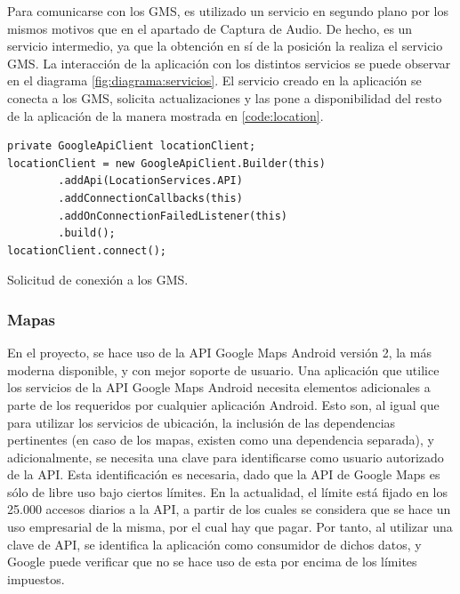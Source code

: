 Para comunicarse con los \ac{GMS}, es utilizado un servicio en segundo plano por los mismos motivos que en el apartado de Captura de Audio. De hecho, es un servicio intermedio, ya que la obtención en sí de la posición la realiza el servicio \ac{GMS}. La interacción de la aplicación con los distintos servicios se puede observar en el diagrama \ref{fig:diagrama:servicios}. El servicio creado en la aplicación se conecta a los \ac{GMS}, solicita actualizaciones y las pone a disponibilidad del resto de la aplicación de la manera mostrada en \ref{code:location}.

\begin{listing}[h] 
\begin{verbatim}
private GoogleApiClient locationClient;
locationClient = new GoogleApiClient.Builder(this)
        .addApi(LocationServices.API)
        .addConnectionCallbacks(this)
        .addOnConnectionFailedListener(this)
        .build();
locationClient.connect();
\end{verbatim}
\caption{Solicitud de conexión a los GMS.}
\label{code:location}
\end{listing}

\subsubsection{Mapas}
    En el proyecto, se hace uso de la API Google Maps Android versión 2, la más moderna disponible, y con mejor soporte de usuario. Una aplicación que utilice los servicios de la API Google Maps Android necesita elementos adicionales a parte de los requeridos por cualquier aplicación Android. Esto son, al igual que para utilizar los servicios de ubicación, la inclusión de las dependencias pertinentes (en caso de los mapas, existen como una dependencia separada), y adicionalmente, se necesita una clave para identificarse como usuario autorizado de la \ac{API}. Esta identificación es necesaria, dado que la API de Google Maps es sólo de libre uso bajo ciertos límites. En la actualidad, el límite está fijado en los 25.000 accesos diarios a la API, a partir de los cuales se considera que se hace un uso empresarial de la misma, por el cual hay que pagar. Por tanto, al utilizar una clave de API, se identifica la aplicación como consumidor de dichos datos, y Google puede verificar que no se hace uso de esta por encima de los límites impuestos.
        
